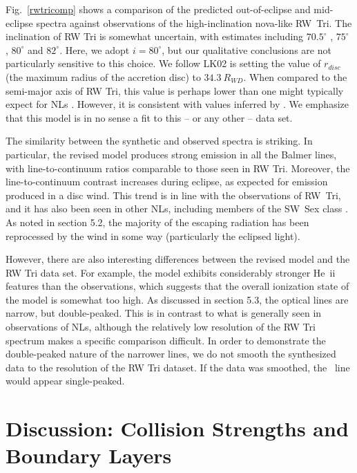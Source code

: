 Fig.~\ref{rwtricomp} shows a comparison of the predicted
out-of-eclipse and mid-eclipse spectra against observations of the
high-inclination nova-like RW~Tri. The inclination of RW Tri is
somewhat uncertain, with estimates including $70.5^\circ$
\citep{smak1995}, $75^\circ$ \citep{groot2004}, $80^\circ$
\citep{longmore1981} and $82^\circ$\citep{frankking1981}. Here, we
adopt $i = 80^\circ$, but our qualitative conclusions are not
particularly sensitive to this choice. 
We follow LK02 is setting the value of $r_{disc}$ (the maximum radius of the accretion disc)
to $34.3~R_{WD}$. When compared to the semi-major axis of RW Tri,
this value is perhaps lower than one might 
typically expect for NLs \citep{harropallinwarner1996}. 
However, it is consistent
with values inferred by \cite{rutten1992}.
We emphasize that this model is in no sense a fit to this -- or any other -- data set.


The similarity between the synthetic and observed spectra is
striking. In particular, the revised model produces strong emission in
all the Balmer lines, with line-to-continuum ratios comparable to
those seen in RW Tri. Moreover, the line-to-continuum contrast
increases during eclipse, as expected for emission produced in a disc
wind. This trend is in line with the observations of RW~Tri, and it
has also been seen in other NLs, including members of the SW~Sex class
\citep{neustroev2011}. As noted in section 5.2, the majority
of the escaping radiation has been reprocessed by the wind in some way
(particularly the eclipsed light).

However, there are also interesting differences between the revised
model and the RW Tri data set. For example, the model exhibits
considerably stronger He~{\sc ii} features than the observations,
which suggests that the overall ionization state of the model is
somewhat too high. As discussed in section 5.3, the optical lines are
narrow, but double-peaked. 
This is in contrast to what is generally seen in observations
of NLs, although the relatively low resolution of the RW Tri
spectrum makes a specific comparison difficult. In order to demonstrate
the double-peaked nature of the narrower lines, we do not 
smooth the synthesized data to the resolution of the RW Tri dataset.
If the data was smoothed, the \ha\ line would appear single-peaked.

\section{Discussion: Collision Strengths and Boundary Layers}
\label{sec:coll_bl}


